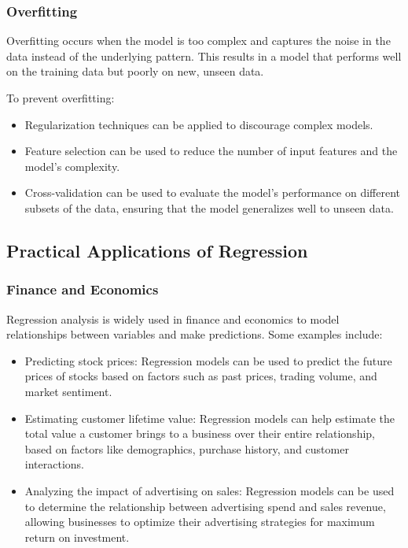 \documentclass{beamer}
\begin{document}
\subsubsection{Overfitting}
Overfitting occurs when the model is too complex and captures the noise in the data instead of the underlying pattern. This results in a model that performs well on the training data but poorly on new, unseen data.

To prevent overfitting:

\begin{itemize}
\item Regularization techniques can be applied to discourage complex models.
\item Feature selection can be used to reduce the number of input features and the model's complexity.
\item Cross-validation can be used to evaluate the model's performance on different subsets of the data, ensuring that the model generalizes well to unseen data.
\end{itemize}

\subsection{Practical Applications of Regression}

\subsubsection{Finance and Economics}

Regression analysis is widely used in finance and economics to model relationships between variables and make predictions. Some examples include:

\begin{itemize}
\item Predicting stock prices: Regression models can be used to predict the future prices of stocks based on factors such as past prices, trading volume, and market sentiment.
\item Estimating customer lifetime value: Regression models can help estimate the total value a customer brings to a business over their entire relationship, based on factors like demographics, purchase history, and customer interactions.
\item Analyzing the impact of advertising on sales: Regression models can be used to determine the relationship between advertising spend and sales revenue, allowing businesses to optimize their advertising strategies for maximum return on investment.
\end{itemize}
\end{document}
